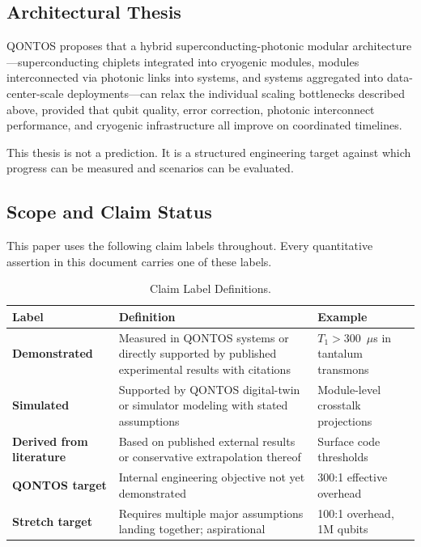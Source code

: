 \documentclass[conference]{IEEEtran}
\begin{document}
\subsection{Architectural Thesis}

QONTOS proposes that a hybrid superconducting-photonic modular architecture---superconducting chiplets integrated into cryogenic modules, modules interconnected via photonic links into systems, and systems aggregated into data-center-scale deployments---can relax the individual scaling bottlenecks described above, provided that qubit quality, error correction, photonic interconnect performance, and cryogenic infrastructure all improve on coordinated timelines.

This thesis is not a prediction. It is a structured engineering target against which progress can be measured and scenarios can be evaluated.

\subsection{Scope and Claim Status}

This paper uses the following claim labels throughout. Every quantitative assertion in this document carries one of these labels.

\begin{table}[htbp]
\centering
\caption{Claim Label Definitions.}
\label{tab:claim_labels}
\begin{tabular}{lp{3cm}p{2.5cm}}
\toprule
\textbf{Label} & \textbf{Definition} & \textbf{Example} \\
\midrule
\textbf{Demonstrated} & Measured in QONTOS systems or directly supported by published experimental results with citations & $T_1 > 300$~$\mu$s in tantalum transmons~\cite{bland2025} \\
\textbf{Simulated} & Supported by QONTOS digital-twin or simulator modeling with stated assumptions & Module-level crosstalk projections \\
\textbf{Derived from literature} & Based on published external results or conservative extrapolation thereof & Surface code thresholds~\cite{fowler2012} \\
\textbf{QONTOS target} & Internal engineering objective not yet demonstrated & 300:1 effective overhead \\
\textbf{Stretch target} & Requires multiple major assumptions landing together; aspirational & 100:1 overhead, 1M qubits \\
\bottomrule
\end{tabular}
\end{table}
\end{document}

